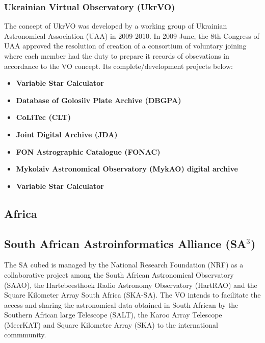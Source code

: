 \subsubsection{Ukrainian Virtual Observatory (UkrVO)}
The concept of UkrVO \cite{website:ukrvo-home} was developed by a working group
of Ukrainian Astronomical Association (UAA) in 2009-2010. In 2009 June, the 8th
Congress of UAA approved the resolution of creation of a consortium of voluntary
joining where each member had the duty to prepare it records of obsevations in
accordance to the VO concept. Its complete/development projects below:

\begin{itemize}
\item \textbf{Variable Star Calculator}

\item \textbf{Database of Golosiiv Plate Archive (DBGPA)}

\item \textbf{CoLiTec (CLT)}

\item \textbf{Joint Digital Archive (JDA)}

\item \textbf{FON Astrographic Catalogue (FONAC)}

\item \textbf{Mykolaiv Astronomical Observatory (MykAO) digital archive}

\item \textbf{Variable Star Calculator}
\end{itemize}

\subsection{Africa}
\subsection{South African Astroinformatics Alliance (SA$ ^{3}  $)}
The SA cubed \cite{website:sa3-home} is managed by the National Research
Foundation (NRF) as a collaborative project among the South African Astronomical
Observatory (SAAO), the Hartebeesthoek Radio Astronomy Observatory (HartRAO) and
the Square Kilometer Array South Africa (SKA-SA). The VO intends to facilitate
the access and sharing the astronomical data obtained in South African by the
Southern African large Telescope (SALT), the Karoo Array Telescope (MeerKAT) and
Square Kilometre Array (SKA) to the international commmunity. %

